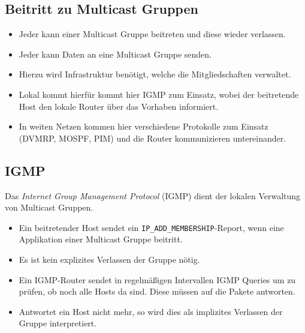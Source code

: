 \documentclass[a4paper, 11pt, accentcolor = tud3b]{tudreport}
\begin{document}
            \subsection{Beitritt zu Multicast Gruppen}
                \begin{itemize}
                	\item Jeder kann einer Multicast Gruppe beitreten und diese wieder verlassen.
                	\item Jeder kann Daten an eine Multicast Gruppe senden.
                	\item Hierzu wird Infrastruktur benötigt, welche die Mitgliedschaften verwaltet.
                	\item Lokal kommt hierfür kommt hier IGMP zum Einsatz, wobei der beitretende Host den lokale Router über das Vorhaben informiert.
                	\item In weiten Netzen kommen hier verschiedene Protokolle zum Einsatz (DVMRP, MOSPF, PIM) und die Router kommunizieren untereinander.
                \end{itemize}

            \subsection{IGMP}
	            Das \textit{Internet Group Management Protocol} (IGMP) dient der lokalen Verwaltung von Multicast Gruppen.
	            \begin{itemize}
	            	\item Ein beitretender Host sendet ein \texttt{IP\_ADD\_MEMBERSHIP}-Report, wenn eine Applikation einer Multicast Gruppe beitritt.
		            \item Es ist kein explizites Verlassen der Gruppe nötig.
		            \item Ein IGMP-Router sendet in regelmäßigen Intervallen IGMP Queries um zu prüfen, ob noch alle Hosts da sind. Diese müssen auf die Pakete antworten.
		            \item Antwortet ein Host nicht mehr, so wird dies als implizites Verlassen der Gruppe interpretiert.
	            \end{itemize}
\end{document}
